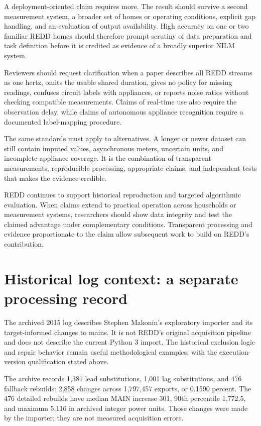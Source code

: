 \documentclass[11pt,letterpaper]{article}
\begin{document}
A deployment-oriented claim requires more. The result should survive a second measurement system, a broader set of homes or operating conditions, explicit gap handling, and an evaluation of output availability. High accuracy on one or two familiar REDD homes should therefore prompt scrutiny of data preparation and task definition before it is credited as evidence of a broadly superior NILM system.

Reviewers should request clarification when a paper describes all REDD streams as one hertz, omits the usable shared duration, gives no policy for missing readings, confuses circuit labels with appliances, or reports noise ratios without checking compatible measurements. Claims of real-time use also require the observation delay, while claims of autonomous appliance recognition require a documented label-mapping procedure.

The same standards must apply to alternatives. A longer or newer dataset can still contain imputed values, asynchronous meters, uncertain units, and incomplete appliance coverage. It is the combination of transparent measurements, reproducible processing, appropriate claims, and independent tests that makes the evidence credible.

REDD continues to support historical reproduction and targeted algorithmic evaluation. When claims extend to practical operation across households or measurement systems, researchers should show data integrity and test the claimed advantage under complementary conditions. Transparent processing and evidence proportionate to the claim allow subsequent work to build on REDD's contribution.


\clearpage
\section{Historical log context: a separate processing record}
The archived 2015 log describes Stephen Makonin's exploratory importer and its target-informed changes to mains. It is not REDD's original acquisition pipeline and does not describe the current Python 3 import. The historical exclusion logic and repair behavior remain useful methodological examples, with the execution-version qualification stated above. \cite{ref4,ref5}

The archive records 1,381 lead substitutions, 1,001 lag substitutions, and 476 fallback rebuilds: 2,858 changes across 1,797,457 exports, or 0.1590 percent. The 476 detailed rebuilds have median MAIN increase 301, 90th percentile 1,772.5, and maximum 5,116 in archived integer power units. Those changes were made by the importer; they are not measured acquisition errors.
\end{document}
